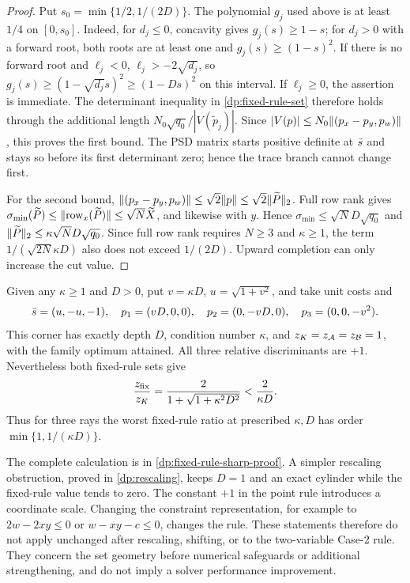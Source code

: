 \begin{proof}
Put $s_0=\min\{1/2,1/(2D)\}$. The polynomial $g_j$ used above is at least
$1/4$ on $[0,s_0]$. Indeed, for $d_j\le0$, concavity gives
$g_j(s)\ge1-s$; for $d_j>0$ with a forward root, both roots are at least
one and $g_j(s)\ge(1-s)^2$. If there is no forward root and $\ell_j<0$,
$\ell_j>-2\sqrt{d_j}$, so $g_j(s)\ge(1-\sqrt{d_j}s)^2\ge(1-Ds)^2$
on this interval. If $\ell_j\ge0$, the assertion is immediate.
The determinant inequality in \cref{dp:fixed-rule-set} therefore holds
through the additional length $N_0\sqrt{q_0}/|V(\widetilde p_j)|$.
Since
$|V(p)|\le N_0\lVert(p_x-p_y,p_w)\rVert$, this proves the first bound.
The PSD matrix starts positive definite at $\bar s$ and stays so before its
first determinant zero; hence the trace branch cannot change first.

For the second bound,
$\lVert(p_x-p_y,p_w)\rVert\le\sqrt2\lVert p\rVert\le\sqrt2\lVert\widetilde P\rVert_2$.
Full row rank gives
$\sigma_{\min}(\widetilde P)\le\lVert\operatorname{row}_x(\widetilde P)\rVert
\le\sqrt N\widetilde X$, and likewise with $y$. Hence
$\sigma_{\min}\le\sqrt N D\sqrt{q_0}$ and
$\lVert\widetilde P\rVert_2\le\kappa\sqrt N D\sqrt{q_0}$.
Since full row rank requires $N\ge3$ and $\kappa\ge1$, the term
$1/(\sqrt{2N}\kappa D)$ also does not exceed $1/(2D)$.
Upward completion can only increase the cut value.
\end{proof}

\begin{proposition}\label{dp:fixed-rule-sharp}
Given any $\kappa\ge1$ and $D>0$, put $v=\kappa D$,
$u=\sqrt{1+v^2}$, and take unit costs and
\[
 \bar s=(u,-u,-1),\quad
 p_1=(vD,0,0),\quad p_2=(0,-vD,0),\quad p_3=(0,0,-v^2).
\]
This corner has exactly depth $D$, condition number $\kappa$, and
$z_K=z_{\mathcal A}=z_{\mathcal B}=1$, with the family optimum attained. All three relative
discriminants are $+1$. Nevertheless both fixed-rule sets give
\[
 \frac{z_{\mathrm{fix}}}{z_K}=
 \frac{2}{1+\sqrt{1+\kappa^2D^2}}<\frac2{\kappa D}.
\]
Thus for three rays the worst fixed-rule ratio at prescribed $\kappa,D$
has order $\min\{1,1/(\kappa D)\}$.
\end{proposition}

The complete calculation is in \cref{dp:fixed-rule-sharp-proof}.
A simpler rescaling obstruction, proved in \cref{dp:rescaling}, keeps
$D=1$ and an exact cylinder while the fixed-rule value tends to zero.
The constant $+1$ in the point rule introduces a coordinate scale. Changing
the constraint representation, for example to $2w-2xy\le0$ or
$w-xy-c\le0$, changes the rule. These statements therefore do not apply
unchanged after rescaling, shifting, or to the two-variable Case-2 rule.
They concern the set geometry before numerical safeguards or additional
strengthening, and do not imply a solver performance improvement.

